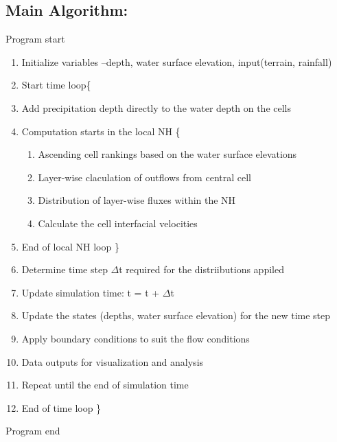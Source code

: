 \subsection*{Main Algorithm:}
Program start
\begin{enumerate}
	\item Initialize variables –depth, water surface elevation, input(terrain, rainfall)
	\item Start time loop\{
	\item Add precipitation depth directly to the water depth on the cells
	\item Computation starts in the local NH \{
	\begin{enumerate}
		\item Ascending cell rankings based on the water surface elevations
		\item Layer-wise claculation of outflows from central cell
		\item Distribution of layer-wise fluxes within the NH
		\item Calculate the cell interfacial velocities
	\end{enumerate}
	\item End of local NH loop \}
	\item Determine time step $\Delta$t required for the distriibutions appiled
	\item Update simulation time: t = t + $\Delta$t
	\item Update the states (depths, water surface elevation) for the new time step
	\item Apply boundary conditions to suit the flow conditions
	\item Data outputs for visualization and analysis
	\item Repeat until the end of simulation time
	\item End of time loop \}
\end{enumerate}
Program end

